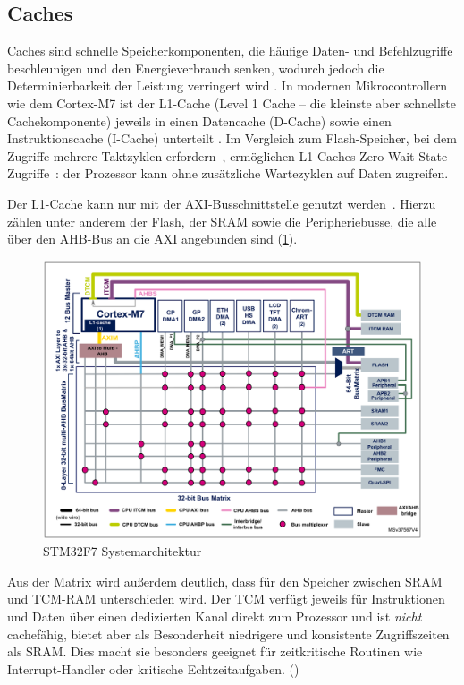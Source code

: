 \subsection{Caches}

Caches sind schnelle Speicherkomponenten, die häufige Daten- und Befehlzugriffe
beschleunigen und den Energieverbrauch senken, wodurch jedoch die
Determinierbarkeit der Leistung verringert wird \cite{ka001150}. In modernen
Mikrocontrollern wie dem Cortex-M7 ist der L1-Cache (Level 1 Cache -- die
kleinste aber schnellste Cachekomponente) jeweils in einen Datencache (D-Cache)
sowie einen Instruktionscache (I-Cache) unterteilt \cite[S. 6]{an4667}. Im
Vergleich zum Flash-Speicher, bei dem Zugriffe mehrere Taktzyklen
erfordern~\cite{stm32_memory_sections}, ermöglichen L1-Caches
Zero-Wait-State-Zugriffe~\cite[S. 6]{an4667}: der Prozessor kann ohne
zusätzliche Wartezyklen auf Daten zugreifen.

Der L1-Cache kann nur mit der \ac{AXI}-Busschnittstelle genutzt werden~\cite[S.
4]{an4839}. Hierzu zählen unter anderem der Flash, der \ac{SRAM} sowie die
Peripheriebusse, die alle über den \ac{AHB}-Bus an die AXI angebunden sind
(\ref{fig:m7_sys_arch}).

\begin{figure}[htb]
    \centering
    \includegraphics[width=1\textwidth]{assets/m7_system_arch}
    \caption{STM32F7 Systemarchitektur \cite[S. 9]{an4667}}
    \label{fig:m7_sys_arch}
\end{figure}

Aus der Matrix wird außerdem deutlich, dass für den Speicher zwischen SRAM und
\ac{TCM}-RAM unterschieden wird. Der TCM verfügt jeweils für Instruktionen und
Daten über einen dedizierten Kanal direkt zum Prozessor und ist \textit{nicht}
cachefähig, bietet aber als Besonderheit niedrigere und konsistente
Zugriffszeiten als SRAM. Dies macht sie besonders geeignet für zeitkritische
Routinen wie Interrupt-Handler oder kritische Echtzeitaufgaben.
(\cite{arm_den0042})

